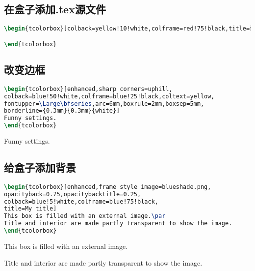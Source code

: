 \documentclass{ctexart}
\begin{document}
\subsection{在盒子添加.tex源文件}
\begin{lstlisting}[language={TeX}]
\begin{tcolorbox}[colback=yellow!10!white,colframe=red!75!black,title=试题解答]

\end{tcolorbox}
\end{lstlisting}
\begin{tcolorbox}[colback=yellow!10!white,colframe=red!75!black,title=试题解答]
	  
\end{tcolorbox}

\subsection{改变边框}
\begin{lstlisting}[language={TeX}]
\begin{tcolorbox}[enhanced,sharp corners=uphill,
colback=blue!50!white,colframe=blue!25!black,coltext=yellow,
fontupper=\Large\bfseries,arc=6mm,boxrule=2mm,boxsep=5mm,
borderline={0.3mm}{0.3mm}{white}]
Funny settings.
\end{tcolorbox}
\end{lstlisting}
\begin{tcolorbox}[enhanced,sharp corners=uphill,
	colback=blue!50!white,colframe=blue!25!black,coltext=yellow,
	fontupper=\Large\bfseries,arc=6mm,boxrule=2mm,boxsep=5mm,
	borderline={0.3mm}{0.3mm}{white}]
	Funny settings.
\end{tcolorbox}

\subsection{给盒子添加背景}
\begin{lstlisting}[language={TeX}]
\begin{tcolorbox}[enhanced,frame style image=blueshade.png,
opacityback=0.75,opacitybacktitle=0.25,
colback=blue!5!white,colframe=blue!75!black,
title=My title]
This box is filled with an external image.\par
Title and interior are made partly transparent to show the image.
\end{tcolorbox}
\end{lstlisting}
\begin{tcolorbox}[enhanced,frame style image=blueshade.png,
	opacityback=0.75,opacitybacktitle=0.25,
	colback=blue!5!white,colframe=blue!75!black,
	title=My title]
	This box is filled with an external image.\par
	Title and interior are made partly transparent to show the image.
\end{tcolorbox}
\end{document}
